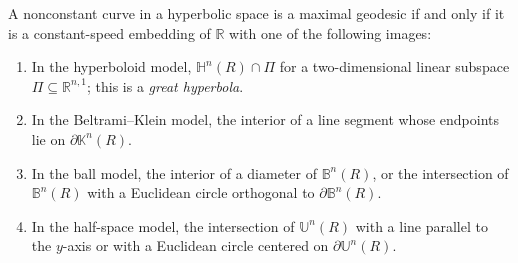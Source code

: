 \begin{proposition}
\label{prop:geodesics-hyperbolic-spaces}
A nonconstant curve in a hyperbolic space is a maximal geodesic if and only if
it is a constant-speed embedding of $\mathbb R$ with one of the following
images:
\begin{enumerate}
\item[(a)] In the hyperboloid model, $\mathbb H^n(R)\cap\Pi$ for a
two-dimensional linear subspace $\Pi\subseteq\mathbb R^{n,1}$; this is a
\emph{great hyperbola}.
\item[(b)] In the Beltrami--Klein model, the interior of a line segment whose
endpoints lie on $\partial\mathbb K^n(R)$.
\item[(c)] In the ball model, the interior of a diameter of $\mathbb B^n(R)$,
or the intersection of $\mathbb B^n(R)$ with a Euclidean circle orthogonal to
$\partial\mathbb B^n(R)$.
\item[(d)] In the half-space model, the intersection of $\mathbb U^n(R)$ with
a line parallel to the $y$-axis or with a Euclidean circle centered on
$\partial\mathbb U^n(R)$.
\end{enumerate}
\end{proposition}


